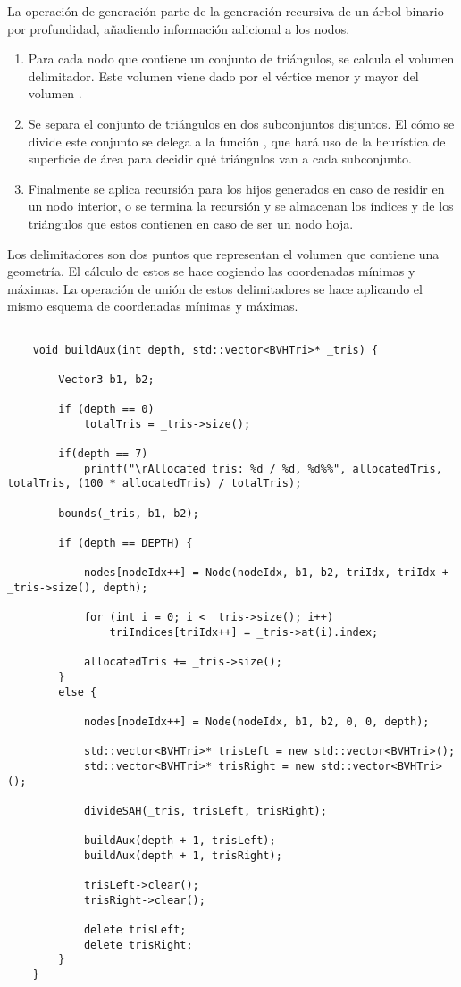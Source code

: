 La operación de generación parte de la generación recursiva de un árbol binario por profundidad, añadiendo información adicional a los nodos.

\begin{enumerate}
	
\item Para cada nodo que contiene un conjunto de triángulos, se calcula el volumen delimitador. Este volumen viene dado por el vértice menor y mayor del volumen .

\item Se separa el conjunto de triángulos en dos subconjuntos disjuntos. El cómo se divide este conjunto se delega a la función , que hará uso de la heurística de superficie de área para decidir qué triángulos van a cada subconjunto.

\item Finalmente se aplica recursión para los hijos generados en caso de residir en un nodo interior, o se termina la recursión y se almacenan los índices  y  de los triángulos que estos contienen en caso de ser un nodo hoja.

\end{enumerate}

Los delimitadores son dos puntos que representan el volumen que contiene una geometría. El cálculo de estos se hace cogiendo las coordenadas mínimas y máximas. La operación de unión de estos delimitadores se hace aplicando el mismo esquema de coordenadas mínimas y máximas.

\begin{lstlisting}
	
	void buildAux(int depth, std::vector<BVHTri>* _tris) {

		Vector3 b1, b2;

		if (depth == 0)
			totalTris = _tris->size();

		if(depth == 7)
			printf("\rAllocated tris: %d / %d, %d%%", allocatedTris, totalTris, (100 * allocatedTris) / totalTris);

		bounds(_tris, b1, b2);

		if (depth == DEPTH) {

			nodes[nodeIdx++] = Node(nodeIdx, b1, b2, triIdx, triIdx + _tris->size(), depth);

			for (int i = 0; i < _tris->size(); i++)
				triIndices[triIdx++] = _tris->at(i).index;

			allocatedTris += _tris->size();
		}
		else {

			nodes[nodeIdx++] = Node(nodeIdx, b1, b2, 0, 0, depth);

			std::vector<BVHTri>* trisLeft = new std::vector<BVHTri>();
			std::vector<BVHTri>* trisRight = new std::vector<BVHTri>();

			divideSAH(_tris, trisLeft, trisRight);

			buildAux(depth + 1, trisLeft);
			buildAux(depth + 1, trisRight);

			trisLeft->clear();
			trisRight->clear();

			delete trisLeft;
			delete trisRight;
		}
	}
	
\end{lstlisting}

